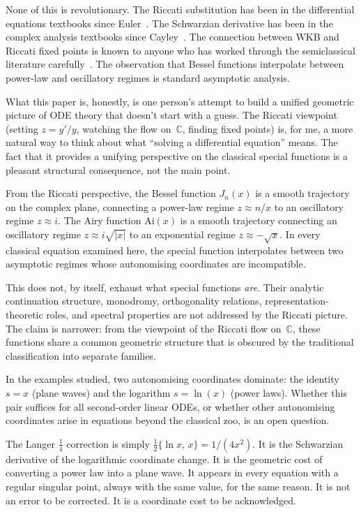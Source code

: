 \documentclass{amsart}
\theoremstyle{definition}
\theoremstyle{remark}
\begin{document}
None of this is revolutionary. The Riccati substitution has been in the differential equations textbooks since Euler~\cite{Euler1762}. The Schwarzian derivative has been in the complex analysis textbooks since Cayley~\cite{Cayley1880}. The connection between WKB and Riccati fixed points is known to anyone who has worked through the semiclassical literature carefully~\cite{Olver1974, BenOrszag1978}. The observation that Bessel functions interpolate between power-law and oscillatory regimes is standard asymptotic analysis.

What this paper is, honestly, is one person's attempt to build a unified geometric picture of ODE theory that doesn't start with a guess. The Riccati viewpoint (setting $z = y'/y$, watching the flow on~$\mathbb{C}$, finding fixed points) is, for me, a more natural way to think about what ``solving a differential equation'' means. The fact that it provides a unifying perspective on the classical special functions is a pleasant structural consequence, not the main point.

From the Riccati perspective, the Bessel function $J_n(x)$ is a smooth trajectory on the complex plane, connecting a power-law regime $z \approx n/x$ to an oscillatory regime $z \approx i$. The Airy function $\mathrm{Ai}(x)$ is a smooth trajectory connecting an oscillatory regime $z \approx i\sqrt{|x|}$ to an exponential regime $z \approx -\sqrt{x}$. In every classical equation examined here, the special function interpolates between two asymptotic regimes whose autonomising coordinates are incompatible.

This does not, by itself, exhaust what special functions \emph{are}. Their analytic continuation structure, monodromy, orthogonality relations, representation-theoretic roles, and spectral properties are not addressed by the Riccati picture. The claim is narrower: from the viewpoint of the Riccati flow on~$\mathbb{C}$, these functions share a common geometric structure that is obscured by the traditional classification into separate families.

In the examples studied, two autonomising coordinates dominate: the identity $s = x$ (plane waves) and the logarithm $s = \ln(x)$ (power laws). Whether this pair suffices for all second-order linear ODEs, or whether other autonomising coordinates arise in equations beyond the classical zoo, is an open question.

The Langer $\tfrac{1}{4}$ correction is simply $\tfrac{1}{2}\{\ln x,\, x\} = 1/(4x^2)$. It is the Schwarzian derivative of the logarithmic coordinate change. It is the geometric cost of converting a power law into a plane wave. It appears in every equation with a regular singular point, always with the same value, for the same reason. It is not an error to be corrected. It is a coordinate cost to be acknowledged.
\end{document}
